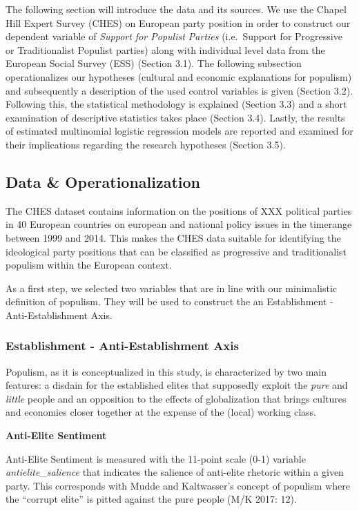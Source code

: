 \documentclass[]{article}
\title{}
\author{}
\date{}
\begin{document}
The following section will introduce the data and its sources. We use
the Chapel Hill Expert Survey (CHES) on European party position in order
to construct our dependent variable of \emph{Support for Populist
Parties} (i.e.~Support for Progressive or Traditionalist Populist
parties) along with individual level data from the European Social
Survey (ESS) (Section 3.1). The following subsection operationalizes our
hypotheses (cultural and economic explanations for populism) and
subsequently a description of the used control variables is given
(Section 3.2). Following this, the statistical methodology is explained
(Section 3.3) and a short examination of descriptive statistics takes
place (Section 3.4). Lastly, the results of estimated multinomial
logistic regression models are reported and examined for their
implications regarding the research hypotheses (Section 3.5).

\subsection{Data \& Operationalization}\label{data-operationalization}

The CHES dataset contains information on the positions of XXX political
parties in 40 European countries on european and national policy issues
in the timerange between 1999 and 2014. This makes the CHES data
suitable for identifying the ideological party positions that can be
classified as progressive and traditionalist populism within the
European context.

As a first step, we selected two variables that are in line with our
minimalistic definition of populism. They will be used to construct the
an Establishment - Anti-Establishment Axis.

\subsubsection{Establishment - Anti-Establishment
Axis}\label{establishment---anti-establishment-axis}

Populism, as it is conceptualized in this study, is characterized by two
main features: a disdain for the established elites that supposedly
exploit the \emph{pure} and \emph{little} people and an opposition to
the effects of globalization that brings cultures and economies closer
together at the expense of the (local) working class.

\textbf{Anti-Elite Sentiment}

Anti-Elite Sentiment is measured with the 11-point scale (0-1) variable
\emph{antielite\_salience} that indicates the salience of anti-elite
rhetoric within a given party. This corresponds with Mudde and
Kaltwasser's concept of populism where the ``corrupt elite'' is pitted
against the pure people (M/K 2017: 12).
\end{document}

